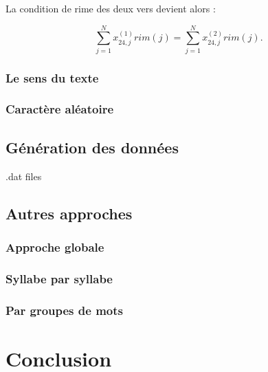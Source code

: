 \documentclass[a4paper,11pt]{article}
\begin{document}
La condition de rime des deux vers devient alors :

\[ \sum_{j=1}^{N} x_{24,j}^{(1)}  rim(j) = \sum_{j=1}^{N} x_{24,j}^{(2)}  rim(j). \]

\subsubsection{Le sens du texte}

\subsubsection{Caractère aléatoire}

\subsection{Génération des données}

.dat files

\subsection{Autres approches}

\subsubsection{Approche globale}

\subsubsection{Syllabe par syllabe}

\subsubsection{Par groupes de mots}

\section{Conclusion}
\end{document}
